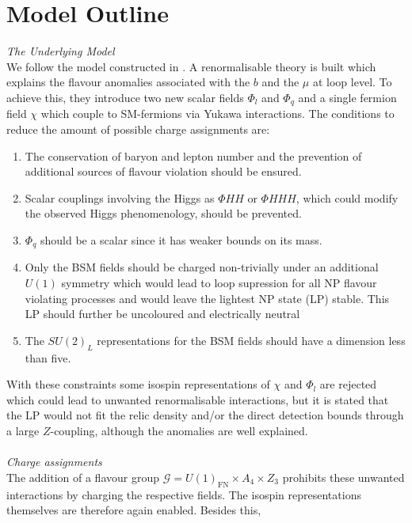 \section{Model Outline}
\textit{The Underlying Model}\\
\noindent We follow the model constructed
in \cite{Grip}. A renormalisable theory is built which explains the flavour anomalies associated with the $b$ and the $\mu$ at loop level. To achieve this, 
they introduce two new scalar fields $\Phi_l$ and $\Phi_q$ and a single fermion field $\chi$ which couple to SM-fermions via Yukawa interactions. 
The conditions to reduce the amount of possible charge assignments are:
\begin{enumerate}
 \item The conservation of baryon and lepton number and the prevention of additional sources of flavour violation should be ensured.
 \item Scalar couplings involving the Higgs as $\Phi H H$ or $\Phi H H H$, which could modify the observed Higgs phenomenology, should be prevented.
 \item $\Phi_q$ should be a scalar since it has weaker bounds on its mass.
 \item Only the BSM fields should be charged non-trivially under an additional $U(1)$ symmetry which would lead to loop supression for all NP 
 flavour violating processes and would leave the lightest NP state (LP) stable. This LP should further be uncoloured and electrically neutral 
 \item The $SU(2)_L$ representations for the BSM fields should have a dimension less than five.
\end{enumerate}
With these constraints some isospin representations of $\chi$ and $\Phi_l$ are rejected which could lead to unwanted renormalisable interactions, 
but it is stated that the LP would not fit the relic density and/or the direct detection bounds through a large $Z$-coupling, although the anomalies 
are well explained. \\ \\
\noindent \textit{Charge assignments}\\ \noindent
The addition of a flavour group $\mathcal{G} = U(1)_\text{FN}\times A_4 \times Z_3$ \cite{FerA4}\cite{VarzTotMod} prohibits
these unwanted interactions by charging the respective fields. The isospin representations themselves are therefore again enabled. Besides this,

